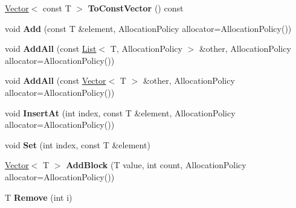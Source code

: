 \begin{DoxyCompactItemize}
\item 
\hyperlink{classv8_1_1internal_1_1_vector}{Vector}$<$ const T $>$ {\bfseries To\+Const\+Vector} () const \hypertarget{classv8_1_1internal_1_1_list_a44fc5179cf6edd260dd19386782dbba1}{}\label{classv8_1_1internal_1_1_list_a44fc5179cf6edd260dd19386782dbba1}

\item 
void {\bfseries Add} (const T \&element, Allocation\+Policy allocator=Allocation\+Policy())\hypertarget{classv8_1_1internal_1_1_list_a18b8264c716e34018e8813be890c1cab}{}\label{classv8_1_1internal_1_1_list_a18b8264c716e34018e8813be890c1cab}

\item 
void {\bfseries Add\+All} (const \hyperlink{classv8_1_1internal_1_1_list}{List}$<$ T, Allocation\+Policy $>$ \&other, Allocation\+Policy allocator=Allocation\+Policy())\hypertarget{classv8_1_1internal_1_1_list_ab352e95794a628d45af7db424303ec6b}{}\label{classv8_1_1internal_1_1_list_ab352e95794a628d45af7db424303ec6b}

\item 
void {\bfseries Add\+All} (const \hyperlink{classv8_1_1internal_1_1_vector}{Vector}$<$ T $>$ \&other, Allocation\+Policy allocator=Allocation\+Policy())\hypertarget{classv8_1_1internal_1_1_list_a549c0a1f12fb89f1ff9e7e00058912ce}{}\label{classv8_1_1internal_1_1_list_a549c0a1f12fb89f1ff9e7e00058912ce}

\item 
void {\bfseries Insert\+At} (int index, const T \&element, Allocation\+Policy allocator=Allocation\+Policy())\hypertarget{classv8_1_1internal_1_1_list_a840c1617f33eedc78b6e9d088b9aa08a}{}\label{classv8_1_1internal_1_1_list_a840c1617f33eedc78b6e9d088b9aa08a}

\item 
void {\bfseries Set} (int index, const T \&element)\hypertarget{classv8_1_1internal_1_1_list_a1eee3d0d76fda21a6a6b9007ffd7209c}{}\label{classv8_1_1internal_1_1_list_a1eee3d0d76fda21a6a6b9007ffd7209c}

\item 
\hyperlink{classv8_1_1internal_1_1_vector}{Vector}$<$ T $>$ {\bfseries Add\+Block} (T value, int count, Allocation\+Policy allocator=Allocation\+Policy())\hypertarget{classv8_1_1internal_1_1_list_aa5339d7dd2ebe2e4917db71f65a422fc}{}\label{classv8_1_1internal_1_1_list_aa5339d7dd2ebe2e4917db71f65a422fc}

\item 
T {\bfseries Remove} (int i)\hypertarget{classv8_1_1internal_1_1_list_a67f1d50f50f87183c7a3864bcbc2e0db}{}\label{classv8_1_1internal_1_1_list_a67f1d50f50f87183c7a3864bcbc2e0db}


\end{DoxyCompactItemize}
